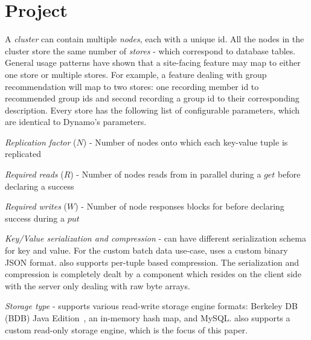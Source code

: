 \section{Project \projectname{}}
\label{sec:system_architecture}

A \projectname{} \emph{cluster} can contain multiple \emph{nodes},
each with a unique id. All the nodes in the cluster store the same
number of \emph{stores} - which correspond to database tables. General
usage patterns have shown that a site-facing feature may map to either
one store or multiple stores. For example, a feature dealing with
group recommendation will map to two stores: one recording member id
to recommended group ids and second recording a group id to their
corresponding description. Every store has the following list of
configurable parameters, which are identical to Dynamo's\cite{dynamo} parameters. 
\begin{compactitem}
  \item \emph {Replication factor} ($N$) - Number of nodes onto which
each key-value tuple is replicated
  \item \emph {Required reads} ($R$) - Number of nodes \projectname{}
reads from in parallel during a $get$ before declaring a success
  \item \emph {Required writes} ($W$) - Number of node responses
\projectname{} blocks for before declaring success during a $put$
  \item \emph {Key/Value serialization and compression} - \projectname{}
can have different serialization schema for key and value. For the
custom batch data use-case, \projectname{} uses a custom binary JSON
format. \projectname{} also supports per-tuple based compression. The
serialization and compression is completely dealt by a component which
resides on the client side with the server only dealing with raw byte
arrays. 
  \item \emph {Storage type} - \projectname{} supports various
read-write storage engine formats: Berkeley DB (BDB) Java
Edition~\cite{bdb}, an in-memory hash map, and MySQL. \projectname{}
also supports a custom read-only storage engine, which is the focus of
this paper.  
\end{compactitem}

